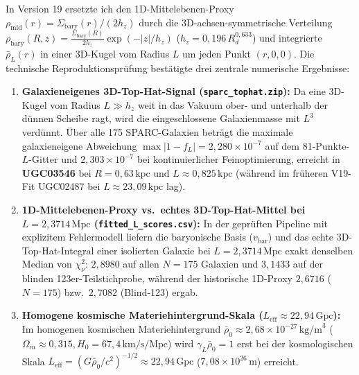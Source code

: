 \documentclass[10pt,a4paper]{article}
\begin{document}
\par
In Version 19 ersetzte ich den 1D-Mittelebenen-Proxy $\rho_{\text{mid}}(r) = \Sigma_{\text{bary}}(r)/(2h_z)$ durch die 3D-achsen-symmetrische Verteilung $\rho_{\text{bary}}(R,z) = \frac{\Sigma_{\text{bary}}(R)}{2h_z}\exp(-|z|/h_z)$ ($h_z = 0{,}196\,R_d^{0{,}633}$) und integrierte $\bar{\rho}_L(r)$ in einer 3D-Kugel vom Radius $L$ um jeden Punkt $(r,0,0)$. Die technische Reproduktionspr\"ufung best\"atigte drei zentrale numerische Ergebnisse:
\begin{enumerate}\setlength{\itemsep}{1pt}\setlength{\parskip}{0pt}\setlength{\topsep}{1pt}
  \item \textbf{Galaxieneigenes 3D-Top-Hat-Signal (\texttt{sparc\_tophat.zip}):} Da eine 3D-Kugel vom Radius $L \gg h_z$ weit in das Vakuum ober- und unterhalb der d\"unnen Scheibe ragt, wird die eingeschlossene Galaxienmasse mit $L^3$ verd\"unnt. \"Uber alle 175 SPARC-Galaxien betr\"agt die maximale galaxieneigene Abweichung $\max |1 - f_L| = 2{,}280\times 10^{-7}$ auf dem 81-Punkte-$L$-Gitter und \textbf{$2{,}303\times 10^{-7}$} bei kontinuierlicher Feinoptimierung, erreicht in \textbf{UGC03546} bei $R = 0{,}63\,\text{kpc}$ und $L \approx 0{,}825\,\text{kpc}$ (w\"ahrend im fr\"uheren V19-Fit UGC02487 bei $L \approx 23{,}09\,\text{kpc}$ lag).
  \item \textbf{1D-Mittelebenen-Proxy vs.\ echtes 3D-Top-Hat-Mittel bei $L = 2{,}3714\,\text{Mpc}$ (\texttt{fitted\_L\_scores.csv}):} In der gepr\"uften Pipeline mit explizitem Fehlermodell liefern die baryonische Basis ($v_{\text{bar}}$) und das echte 3D-Top-Hat-Integral einer isolierten Galaxie bei $L = 2{,}3714\,\text{Mpc}$ exakt denselben Median von $\chi^2_\nu$: \textbf{$2{,}8980$} auf allen $N=175$ Galaxien und \textbf{$3{,}1433$} auf der blinden 123er-Teilstichprobe, w\"ahrend der historische 1D-Proxy $2{,}6716$ ($N=175$) bzw.\ $2{,}7082$ (Blind-123) ergab.
  \item \textbf{Homogene kosmische Materiehintergrund-Skala ($L_{\text{eff}} \approx 22{,}94\,\text{Gpc}$):} Im homogenen kosmischen Materiehintergrund $\bar{\rho}_0 \approx 2{,}68\times 10^{-27}\,\text{kg/m}^3$ ($\Omega_m \approx 0{,}315, H_0 = 67{,}4\,\text{km/s/Mpc}$) wird $\gamma_L\bar{\rho}_0 = 1$ erst bei der kosmologischen Skala $L_{\text{eff}} = (G\bar{\rho}_0/c^2)^{-1/2} \approx 22{,}94\,\text{Gpc}$ ($7{,}08\times 10^{26}\,\text{m}$) erreicht.
\end{enumerate}
\end{document}
